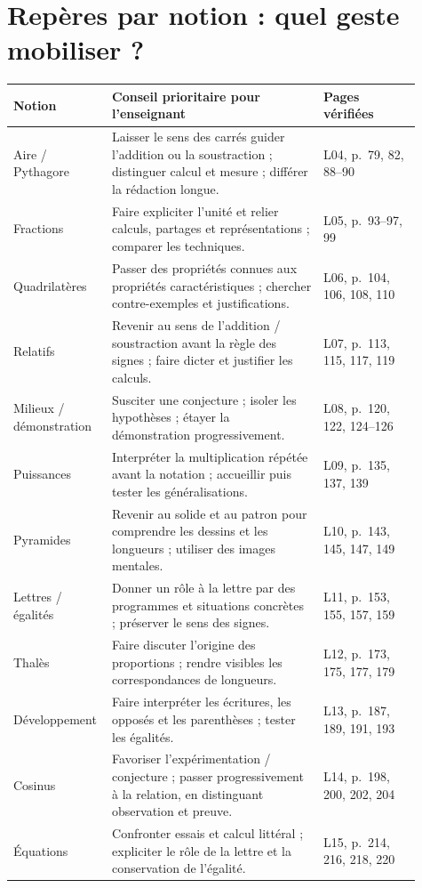 \documentclass[11pt,a4paper]{article}
\begin{document}
\section{Repères par notion : quel geste mobiliser ?}
\begin{longtable}{p{0.18\linewidth}p{0.50\linewidth}p{0.23\linewidth}}
\textbf{Notion} & \textbf{Conseil prioritaire pour l'enseignant} & \textbf{Pages vérifiées}\\\hline
\endhead
Aire / Pythagore & Laisser le sens des carrés guider l'addition ou la soustraction ; distinguer calcul et mesure ; différer la rédaction longue. & L04, p.~79, 82, 88--90\\
Fractions & Faire expliciter l'unité et relier calculs, partages et représentations ; comparer les techniques. & L05, p.~93--97, 99\\
Quadrilatères & Passer des propriétés connues aux propriétés caractéristiques ; chercher contre-exemples et justifications. & L06, p.~104, 106, 108, 110\\
Relatifs & Revenir au sens de l'addition / soustraction avant la règle des signes ; faire dicter et justifier les calculs. & L07, p.~113, 115, 117, 119\\
Milieux / démonstration & Susciter une conjecture ; isoler les hypothèses ; étayer la démonstration progressivement. & L08, p.~120, 122, 124--126\\
Puissances & Interpréter la multiplication répétée avant la notation ; accueillir puis tester les généralisations. & L09, p.~135, 137, 139\\
Pyramides & Revenir au solide et au patron pour comprendre les dessins et les longueurs ; utiliser des images mentales. & L10, p.~143, 145, 147, 149\\
Lettres / égalités & Donner un rôle à la lettre par des programmes et situations concrètes ; préserver le sens des signes. & L11, p.~153, 155, 157, 159\\
Thalès & Faire discuter l'origine des proportions ; rendre visibles les correspondances de longueurs. & L12, p.~173, 175, 177, 179\\
Développement & Faire interpréter les écritures, les opposés et les parenthèses ; tester les égalités. & L13, p.~187, 189, 191, 193\\
Cosinus & Favoriser l'expérimentation / conjecture ; passer progressivement à la relation, en distinguant observation et preuve. & L14, p.~198, 200, 202, 204\\
Équations & Confronter essais et calcul littéral ; expliciter le rôle de la lettre et la conservation de l'égalité. & L15, p.~214, 216, 218, 220\\
\end{longtable}
\end{document}
